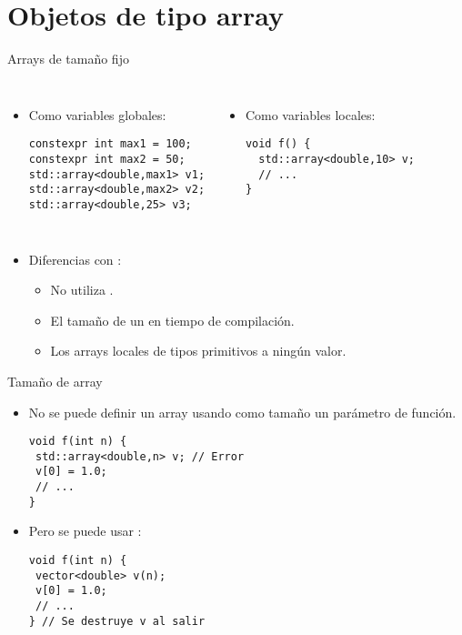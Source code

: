 \section{Objetos de tipo array}

\begin{frame}[t,fragile]{Arrays de tamaño fijo}
\begin{columns}[T]
\begin{itemize}
  \item Como variables globales:
\begin{lstlisting}
constexpr int max1 = 100;
constexpr int max2 = 50;
std::array<double,max1> v1;
std::array<double,max2> v2;
std::array<double,25> v3;
\end{lstlisting}
\end{itemize}

\begin{itemize}
  \item Como variables locales:
\begin{lstlisting}
void f() {
  std::array<double,10> v;
  // ...
}
\end{lstlisting}
\end{itemize}

\end{columns}

\begin{itemize}
  \item Diferencias con :
    \begin{itemize}
      \item No utiliza .
      \item El tamaño de un   en tiempo de 
            compilación.
      \item Los arrays locales de tipos primitivos  a ningún valor.
    \end{itemize}
\end{itemize}
\end{frame}

\begin{frame}[t,fragile]{Tamaño de array}
\begin{itemize}
  \item No se puede definir un array usando como tamaño un parámetro de función.
\begin{lstlisting}
void f(int n) {
 std::array<double,n> v; // Error
 v[0] = 1.0;
 // ...
}
\end{lstlisting}

  \item Pero se puede usar :
\begin{lstlisting}
void f(int n) {
 vector<double> v(n);
 v[0] = 1.0;
 // ...
} // Se destruye v al salir
\end{lstlisting}
\end{itemize}

\end{frame}
